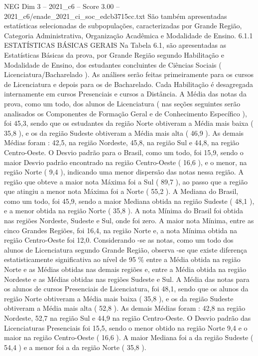 \begin{textsample}{NEG Dim 3 – 2021\_c6 – Score 3.00 – 2021\_c6/enade\_2021\_ci\_soc\_edcb3715cc.txt}
São também apresentadas estatísticas selecionadas de subpopulações, caracterizadas por Grande Região, Categoria Administrativa, Organização Acadêmica e Modalidade de Ensino. 6.1.1 ESTATÍSTICAS BÁSICAS GERAIS Na Tabela 6.1, são apresentadas as Estatísticas Básicas da prova, por Grande Região segundo Habilitação e Modalidade de Ensino, dos estudantes concluintes de Ciências Sociais ( Licenciatura/Bacharelado ).
As análises serão feitas primeiramente para os cursos de Licenciatura e depois para os de Bacharelado.
Cada Habilitação é desagregada internamente em cursos Presenciais e cursos a Distância.
A Média das notas da prova, como um todo, dos alunos de Licenciatura ( nas seções seguintes serão analisados os Componentes de Formação Geral e de Conhecimento Específico ), foi 45,3, sendo que os estudantes da região Norte obtiveram a Média mais baixa ( 35,8 ), e os da região Sudeste obtiveram a Média mais alta ( 46,9 ).
As demais Médias foram : 42,5, na região Nordeste, 45,8, na região Sul e 44,8, na região Centro-Oeste.
O Desvio padrão para o Brasil, como um todo, foi 15,9, sendo o maior Desvio padrão encontrado na região Centro-Oeste ( 16,6 ), e o menor, na região Norte ( 9,4 ), indicando uma menor dispersão das notas nessa região.
A região que obteve a maior nota Máxima foi a Sul ( 89,7 ), ao passo que a região que atingiu a menor nota Máxima foi a Norte ( 55,2 ).
A Mediana do Brasil, como um todo, foi 45,9, sendo a maior Mediana obtida na região Sudeste ( 48,1 ), e a menor obtida na região Norte ( 35,8 ).
A nota Mínima do Brasil foi obtida nas regiões Nordeste, Sudeste e Sul, onde foi zero.
A maior nota Mínima, entre as cinco Grandes Regiões, foi 16,4, na região Norte e, a nota Mínima obtida na região Centro-Oeste foi 12,0.
Considerando -se as notas, como um todo dos alunos de Licenciatura segundo Grande Região, observa -se que existe diferença estatisticamente significativa ao nível de 95 \% entre a Média obtida na região Norte e as Médias obtidas nas demais regiões e, entre a Média obtida na região Nordeste e as Médias obtidas nas regiões Sudeste e Sul.
A Média das notas para os alunos de cursos Presenciais de Licenciatura, foi 48,1, sendo que os alunos da região Norte obtiveram a Média mais baixa ( 35,8 ), e os da região Sudeste obtiveram a Média mais alta ( 52,8 ).
As demais Médias foram : 42,8 na região Nordeste, 52,7 na região Sul e 44,9 na região Centro-Oeste.
O Desvio padrão das Licenciaturas Presenciais foi 15,5, sendo o menor obtido na região Norte 9,4 e o maior na região Centro-Oeste ( 16,6 ).
A maior Mediana foi a da região Sudeste ( 54,4 ) e a menor foi a da região Norte ( 35,8 ).

\end{textsample}
